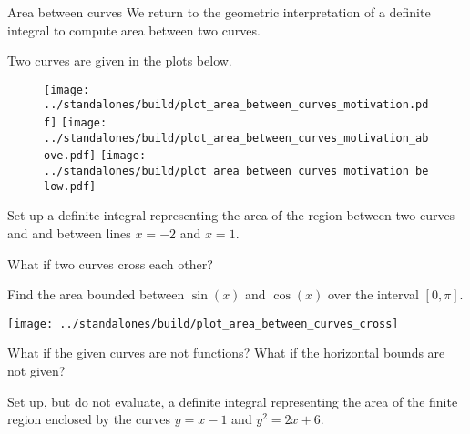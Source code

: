\documentclass[../main.tex]{subfiles}
\begin{document}
\begin{lesson}{Area between curves}
  We return to the geometric interpretation of a definite integral to compute area between two curves.

  \begin{example}
    Two curves are given in the plots below. 
    \begin{figure}[H]
      \centering
      \texttt{[image: ../standalones/build/plot\_area\_between\_curves\_motivation.pdf]}
      \hspace{1em}
      \texttt{[image: ../standalones/build/plot\_area\_between\_curves\_motivation\_above.pdf]}
      \hspace{2em}
      \texttt{[image: ../standalones/build/plot\_area\_between\_curves\_motivation\_below.pdf]}
    \end{figure}

    Set up a definite integral representing the area of the region between two curves  and  and between lines \(x = -2\) and \(x = 1\).


  \end{example}

  What if two curves cross each other?
  \begin{example}
    Find the area bounded between \(\sin(x)\) and \(\cos(x)\) over the interval \([0, \pi]\).

    \texttt{[image: ../standalones/build/plot\_area\_between\_curves\_cross]}

  \end{example}

  What if the given curves are not functions? What if the horizontal bounds are not given?
  \begin{example}
    Set up, but do not evaluate, a definite integral representing the area of the finite region enclosed by the curves \(y = x - 1\) and \(y^{2} = 2x + 6\).


\end{example}
\end{lesson}
\end{document}
